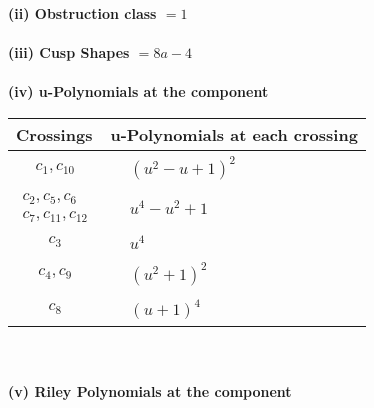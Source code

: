 \documentclass[1p]{elsarticle_modified}
\theoremstyle{definition}
\begin{document}
\flushleft \textbf{(ii) Obstruction class $= 1$}\\~\\
\flushleft \textbf{(iii) Cusp Shapes $= 8 a-4$}\\~\\
\newpage\renewcommand{\arraystretch}{1}
\flushleft \textbf{(iv) u-Polynomials at the component}\newline \\
\begin{tabular}{m{50pt}|m{274pt}}
Crossings & \hspace{64pt}u-Polynomials at each crossing \\
\hline $$\begin{aligned}c_{1},c_{10}\end{aligned}$$&$\begin{aligned}
&(u^2- u+1)^2
\end{aligned}$\\
\hline $$\begin{aligned}c_{2},c_{5},c_{6}\\c_{7},c_{11},c_{12}\end{aligned}$$&$\begin{aligned}
&u^4- u^2+1
\end{aligned}$\\
\hline $$\begin{aligned}c_{3}\end{aligned}$$&$\begin{aligned}
&u^4
\end{aligned}$\\
\hline $$\begin{aligned}c_{4},c_{9}\end{aligned}$$&$\begin{aligned}
&(u^2+1)^2
\end{aligned}$\\
\hline $$\begin{aligned}c_{8}\end{aligned}$$&$\begin{aligned}
&(u+1)^4
\end{aligned}$\\
\hline
\end{tabular}\\~\\
\newpage\renewcommand{\arraystretch}{1}
\flushleft \textbf{(v) Riley Polynomials at the component}\newline \\
\end{document}
